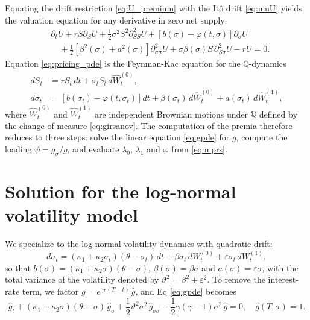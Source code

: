 \documentclass[11pt]{article}
\theoremstyle{remark}
\newcommand{\QQ}{\mathbb{Q}}
\begin{document}
Equating the drift restriction \eqref{eq:U_premium} with the It\^{o} drift \eqref{eq:muU} yields the valuation equation for any derivative in zero net supply:
\begin{equation}\label{eq:pricing_pde}
\begin{split}
&\partial_{t} U  + r S\partial_{S}U + \frac{1}{2} \sigma^{2} S^{2}\partial^{2}_{SS}U+ \left[b(\sigma) -\varphi (t, \sigma) \right]\partial_{\sigma}U \\
&\quad + \frac{1}{2}\left[\beta^{2}(\sigma) + a^{2}(\sigma)\right]\partial^{2}_{\sigma\sigma}U + \sigma\beta(\sigma) S\, \partial^{2}_{S\sigma}U - rU = 0.
\end{split}
\end{equation}
Equation \eqref{eq:pricing_pde} is the Feynman-Kac equation for the $\QQ$-dynamics
\begin{equation}\label{eq:Qdynamics}
\begin{split}
dS_{t} &= r S_{t}\, dt+ \sigma_{t}S_{t}\, d\hat{W}^{(0)}_{t}, \\
d\sigma_{t}&=\left[ b(\sigma_{t}) - \varphi(t, \sigma_{t}) \right] dt + \beta(\sigma_{t})\, d\hat{W}^{(0)}_{t} + a(\sigma_{t})\, d\hat{W}^{(1)}_{t},
\end{split}
\end{equation}
where $\hat{W}^{(0)}_{t}$ and $\hat{W}^{(1)}_{t}$ are independent Brownian motions under $\QQ$ defined by the change of measure \eqref{eq:girsanov}. The computation of the premia therefore reduces to three steps: solve the linear equation \eqref{eq:gpde} for $g$, compute the loading $\psi = g_{\sigma}/g$, and evaluate $\lambda_{0}$, $\lambda_{1}$ and $\varphi$ from \eqref{eq:mprs}.

\section{Solution for the log-normal volatility model}\label{sec:lognormal}

We specialize to the log-normal volatility dynamics with quadratic drift:
\begin{equation}\label{eq:lnsv}
d\sigma_t=(\kappa_1+\kappa_2\sigma_t)(\theta-\sigma_t)\, dt+\beta\sigma_t\, dW^{(0)}_t+\varepsilon\sigma_t\, dW^{(1)}_t,
\end{equation}
so that $b(\sigma) = (\kappa_1+\kappa_2\sigma)(\theta-\sigma)$, $\beta(\sigma)=\beta\sigma$ and $a(\sigma)=\varepsilon\sigma$, with the total variance of the volatility denoted by $\vartheta^{2}=\beta^{2}+\varepsilon^{2}$. To remove the interest-rate term, we factor $g = e^{\gamma r (T-t)}\, \hat{g}$, and Eq \eqref{eq:gpde} becomes
\begin{equation}\label{eq:gpde_ln}
\hat{g}_{t} +   (\kappa_1+\kappa_2\sigma)(\theta-\sigma)\, \hat{g}_{\sigma} +\frac{1}{2} \vartheta^{2} \sigma^{2}\, \hat{g}_{\sigma\sigma} - \frac{1}{2} \gamma (\gamma-1) \sigma^{2}\, \hat{g}  = 0, \quad \hat{g}(T, \sigma) = 1.
\end{equation}
\end{document}
